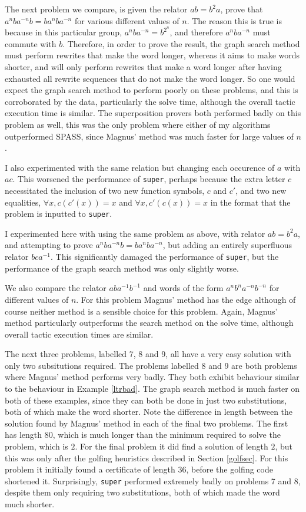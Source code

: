 \documentclass[12pt]{article} %
\theoremstyle{definition}
\theoremstyle{definition}
\theoremstyle{definition}
\theoremstyle{definition}
\begin{document}
The next problem we compare, is given the relator $ab = b^2a$,
prove that $a^nba^{-n}b = ba^nba^{-n}$ for various different values of $n$.
The reason this is true is
because in this particular group, $a^n b a^{-n} = b^{2^n}$, and therefore
$a^n b a^{-n}$ must commute with $b$. Therefore, in order to prove the result,
the graph search method must perform rewrites that make the word longer,
whereas it aims to make words shorter, and will only perform rewrites that
make a word longer after having exhausted all rewrite sequences that
do not make the word longer. So one would expect the graph search method to perform
poorly on these problems, and this is corroborated by the data, particularly the solve time,
although the overall tactic execution time is similar. The superposition provers both performed
badly on this problem as well, this was the only problem where either of my algorithms outperformed
SPASS, since Magnus' method was much faster for large values of $n$.

I also experimented with the same relation but changing each occurence of $a$ with $ac$.
This worsened the performance of \lstinline{super}, perhaps because the extra letter $c$ necessitated the
inclusion of two new function symbols, $c$ and $c'$, and two new equalities,
$\forall x, c (c' (x)) = x$ and $\forall x, c' (c (x)) = x$ in the format that the problem
is inputted to \lstinline{super}.

I experimented here with using the same problem as above, with relator  $ab = b^2a$, and
attempting to prove $a^nba^{-n}b = ba^nba^{-n}$, but adding an entirely superfluous
relator $bca^{-1}$. This significantly damaged the performance of \lstinline{super}, but the performance
of the graph search method was only slightly worse.

We also compare the relator $aba^{-1}b^{-1}$ and words of the form $a^nb^na^{-n}b^{-n}$ for
different values of $n$. For this problem Magnus' method has the edge although of course
neither method is a sensible choice for this problem. Again, Magnus' method particularly
outperforms the search method on the solve time, although overall tactic execution times are
similar.

The next three problems, labelled 7, 8 and 9, all have a very easy solution with only two
subsitutions required. The problems labelled 8 and 9 are both problems where Magnus' method performs
very badly.
They both exhibit behaviour similar to the behaviour in Example \ref{ltrbad}. The graph search
method is much faster on both of these examples, since they can both be done in just two
substitutions, both of which make the word shorter. Note the difference in length between the
solution found by Magnus' method in each of the final two problems. The first has length $80$,
which is much longer than the minimum required to solve the problem, which is $2$.
For the final problem it did find a solution of length $2$, but this was only after the golfing
heuristics described in Section \ref{golfsec}. For this problem it initially found a certificate
of length $36$, before the golfing code shortened it. Surprisingly, \lstinline{super}
performed extremely badly on problems 7 and 8, despite them only requiring two substitutions,
both of which made the word much shorter.
\end{document}
